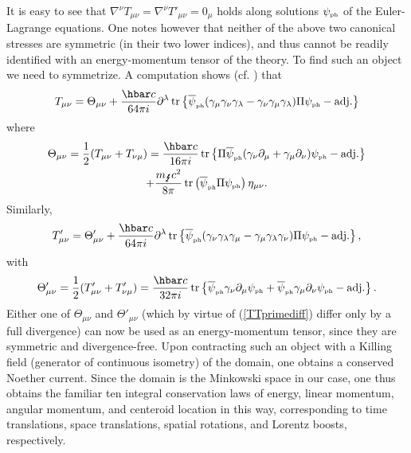 \documentclass[11pt]{article}
\theoremstyle{definition}
\DeclareMathOperator{\tr}{tr}
\newcommand{\refeq}[1]{(\ref{#1})}
\numberwithin{equation}{section}
\newcommand{\beq}{\begin{equation}}
\newcommand{\eeq}{\end{equation}}
\newcommand{\p}{\partial}
\newcommand{\psiPH}{{\psi_{\mbox{\rm\tiny ph}}}}
\newcommand{\psiPHb}{{\overline\psi_{\mbox{\rm\tiny ph}}}}
\newcommand{\mPH}{{m_{\mbox{\Lightning}}}}
\newcommand{\la}{\lambda}
\newcommand{\ga}{\gamma}
\newcommand{\nab}{\nabla}
\newcommand{\half}{\frac{1}{2}}
\begin{document}
It is easy to see that $\nab^\nu T_{\mu\nu} = \nab^\nu T'_{\mu\nu} = 0_\mu$ holds along solutions $\psiPH$ of the Euler-Lagrange equations.
  One notes however that neither of the above two canonical stresses are symmetric (in their two lower indices), and thus cannot be readily 
identified with an energy-momentum tensor of the theory. 
 To find such an object we need to symmetrize. 
 A computation shows (cf. \cite{HC1946}) that
\begin{multline} 
T_{\mu\nu} = 
\Theta_{\mu\nu}+\frac{\hbar c}{64 \pi i} \p^\la \tr \left\{ \psiPHb (\ga_\mu\ga_\nu\ga_\la - \ga_\nu\ga_\mu\ga_\la) \Pi\psiPH - \mbox{adj.} \right\}
\end{multline} 
where
\begin{multline} 
\Theta_{\mu\nu} = \half (T_{\mu\nu} + T_{\nu\mu}) =
\frac{\hbar c}{16 \pi i} \tr\left\{ \Pi\psiPHb (\ga_\nu \p_\mu + \ga_\mu\p_\nu)\psiPH - \mbox{adj.} \right\} \\
+\frac{\mPH c^2}{8 \pi} \tr \left(\psiPHb \Pi\psiPH\right)\eta_{\mu\nu}.
\end{multline} 
Similarly,
\beq 
T'_{\mu\nu} = 
\Theta'_{\mu\nu}+\frac{\hbar c}{64 \pi i} \p^\la \tr\left\{ \psiPHb (\ga_\nu\ga_\la \ga_\mu - \ga_\mu \ga_\la \ga_\nu ) 
\Pi \psiPH - \mbox{adj.} \right\},
\eeq
with 
\beq 
\Theta'_{\mu\nu} = \half( T'_{\mu\nu} + T'_{\nu\mu}) 
= \frac{\hbar c}{32 \pi i} \tr \left\{ \psiPHb \ga_\nu \p_\mu \psiPH + \psiPHb \ga_\mu \p_\nu \psiPH - \mbox{adj.} \right\}.
\eeq
Either one of $\Theta_{\mu\nu}$ and $\Theta'_{\mu\nu}$ (which by virtue of \refeq{TTprimediff} differ only by a full divergence) can 
now be used as an energy-momentum tensor, since they are symmetric and divergence-free. 
 Upon contracting such an object with a Killing field (generator of continuous isometry) of the domain, one obtains a conserved Noether current.
  Since the domain is the Minkowski space in our case, one thus obtains the familiar ten integral conservation laws of energy, linear momentum, 
angular momentum, and centeroid location in this way, corresponding to time translations, space translations, spatial rotations, and Lorentz 
boosts, respectively.  
\end{document}
